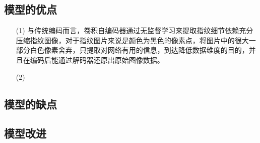 \documentclass{whutmod}
\begin{document}
		\subsection{模型的优点}
			\begin{itemize}                                             
			\item [(1)] 与传统编码而言，卷积自编码器通过无监督学习来提取指纹细节依赖充分压缩指纹图像，对于指纹图片来说是颜色为黑色的像素点，将图片中的很大一部分白色像素舍弃，只提取对网络有用的信息，到达降低数据维度的目的，并且在编码后能通过解码器还原出原始图像数据。
			\item [(2)] 	
			\end{itemize}
		\subsection{模型的缺点}

  		\subsection{模型改进}

  
  
\end{document}
